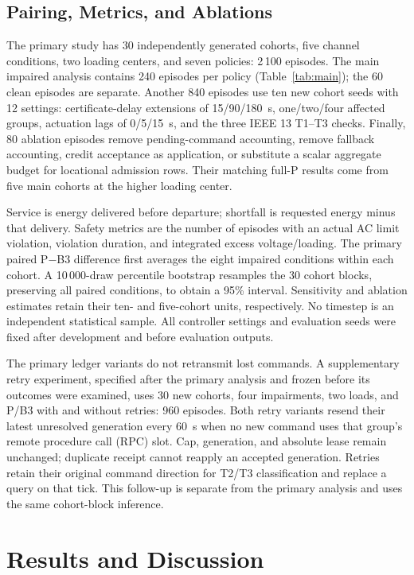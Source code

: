 \subsection{Pairing, Metrics, and Ablations}
The primary study has 30 independently generated cohorts, five channel
conditions, two loading centers, and seven policies: 2\,100 episodes.
The main impaired analysis contains 240 episodes per policy
(Table~\ref{tab:main}); the 60 clean episodes are separate.
Another 840 episodes use ten new cohort seeds with
12 settings: certificate-delay extensions of 15/90/180~s, one/two/four affected
groups, actuation lags of 0/5/15~s, and the three IEEE 13 T1--T3 checks.
Finally, 80 ablation episodes remove pending-command accounting, remove fallback
accounting, credit acceptance as application, or substitute a scalar aggregate
budget for locational admission rows. Their matching full-P results come from
five main cohorts at the higher loading center.

Service is energy delivered before departure; shortfall is requested energy
minus that delivery. Safety metrics are the number of episodes with an actual
AC limit violation, violation duration, and integrated excess voltage/loading.
The primary paired P$-$B3 difference first averages the eight impaired conditions
within each cohort. A 10\,000-draw percentile bootstrap resamples the 30 cohort
blocks, preserving all paired conditions, to obtain a 95\% interval. Sensitivity
and ablation estimates retain their ten- and five-cohort units, respectively.
No timestep is an independent statistical sample. All controller settings and
evaluation seeds were fixed after development and before evaluation outputs.

The primary ledger variants do not retransmit lost commands. A supplementary
retry experiment, specified after the primary analysis and frozen before its
outcomes were examined, uses 30 new cohorts,
four impairments, two loads, and P/B3 with and without retries: 960 episodes.
Both retry variants resend their latest unresolved generation every 60~s when
no new command uses that group's remote procedure call (RPC) slot.
Cap, generation, and absolute lease
remain unchanged; duplicate receipt cannot reapply an accepted generation.
Retries retain their original command direction for T2/T3 classification and
replace a query on that tick. This follow-up is separate from the primary
analysis and uses the same cohort-block inference.

\section{Results and Discussion}
\label{sec:results}

